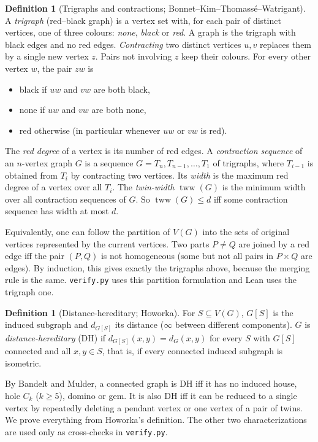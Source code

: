 \documentclass[11pt]{article}
\theoremstyle{definition}
\newtheorem{definition}[theorem]{Definition}
\theoremstyle{remark}
\begin{document}
\begin{definition}[Trigraphs and contractions; Bonnet--Kim--Thomass\'e--Watrigant]
A \emph{trigraph} (red--black graph) is a vertex set with, for each pair of distinct
vertices, one of three colours: \emph{none}, \emph{black} or \emph{red}. A graph is the
trigraph with black edges and no red edges. \emph{Contracting} two distinct vertices
$u,v$ replaces them by a single new vertex $z$. Pairs not involving $z$ keep their
colours. For every other vertex $w$, the pair $zw$ is
\begin{itemize}
\item black if $uw$ and $vw$ are both black,
\item none if $uw$ and $vw$ are both none,
\item red otherwise (in particular whenever $uw$ or $vw$ is red).
\end{itemize}
The \emph{red degree} of a vertex is its number of red edges. A \emph{contraction
sequence} of an $n$-vertex graph $G$ is a sequence $G=T_n,T_{n-1},\dots,T_1$ of
trigraphs, where $T_{i-1}$ is obtained from $T_i$ by contracting two vertices. Its
\emph{width} is the maximum red degree of a vertex over all $T_i$. The \emph{twin-width}
$\operatorname{tww}(G)$ is the minimum width over all contraction sequences of $G$. So
$\operatorname{tww}(G)\le d$ iff some contraction sequence has width at most $d$.
\end{definition}

Equivalently, one can follow the partition of $V(G)$ into the sets of original vertices
represented by the current vertices. Two parts $P\ne Q$ are joined by a red edge iff the pair
$(P,Q)$ is not homogeneous (some but not all pairs in $P\times Q$ are edges). By induction,
this gives exactly the trigraphs above, because the merging rule is the same.
\texttt{verify.py} uses this partition formulation and Lean uses the trigraph one.

\begin{definition}[Distance-hereditary; Howorka]
For $S\subseteq V(G)$, $G[S]$ is the induced subgraph and $d_{G[S]}$ its distance
($\infty$ between different components). $G$ is \emph{distance-hereditary} (DH) if
$d_{G[S]}(x,y)=d_G(x,y)$ for every $S$ with $G[S]$ connected and all $x,y\in S$, that is,
if every connected induced subgraph is isometric.
\end{definition}
By Bandelt and Mulder, a connected graph is DH iff it has no induced house, hole $C_k$
($k\ge5$), domino or gem. It is also DH iff it can be reduced to a single vertex by
repeatedly deleting a pendant vertex or one vertex of a pair of twins. We prove everything
from Howorka's definition. The other two characterizations are used only as cross-checks in
\texttt{verify.py}.
\end{document}
